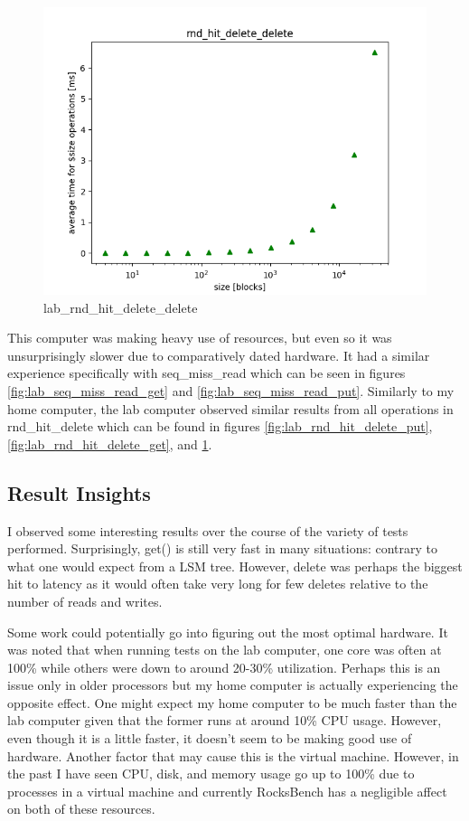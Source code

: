 \documentclass[twocolumn,11pt]{article}
\begin{document}
\begin{figure}[h!]
  \includegraphics[width=\linewidth]{Pictures/LABPC/rnd_hit_delete_complete_delete.png}
  \caption{lab\_rnd\_hit\_delete\_delete}
  \label{fig:lab_rnd_hit_delete_delete}
\end{figure}

This computer was making heavy use of resources, but even so it was
unsurprisingly slower due to comparatively dated hardware. It had a similar
experience specifically with seq\_miss\_read which can be seen in figures
\ref{fig:lab_seq_miss_read_get} and \ref{fig:lab_seq_miss_read_put}. Similarly
to my home computer, the lab computer observed similar results from all
operations in rnd\_hit\_delete which can be found in figures
\ref{fig:lab_rnd_hit_delete_put}, \ref{fig:lab_rnd_hit_delete_get}, and
\ref{fig:lab_rnd_hit_delete_delete}.

\subsection{Result Insights}
\label{subsec:res_insights}

I observed some interesting results over the course of the variety of tests
performed. Surprisingly, get() is still very fast in many situations: contrary
to what one would expect from a LSM tree. However, delete was perhaps the
biggest hit to latency as it would often take very long for few deletes relative
to the number of reads and writes.

Some work could potentially go into figuring out the most optimal hardware. It
was noted that when running tests on the lab computer, one core was often at
100\% while others were down to around 20-30\% utilization. Perhaps this is an
issue only in older processors but my home computer is actually experiencing the
opposite effect. One might expect my home computer to be much faster than the
lab computer given that the former runs at around 10\% CPU usage. However, even
though it is a little faster, it doesn't seem to be making good use of hardware.
Another factor that may cause this is the virtual machine. However, in the past
I have seen CPU, disk, and memory usage go up to 100\% due to processes in a
virtual machine and currently RocksBench has a negligible affect on both of
these resources.
\end{document}
